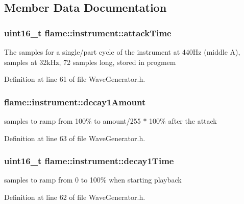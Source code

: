 \subsection{Member Data Documentation}
\hypertarget{structflame_1_1instrument_a9e8428ddc6afef3392234e1ed89bd442}{
\subsubsection[{attack\-Time}]{\setlength{\rightskip}{0pt plus 5cm}uint16\-\_\-t flame\-::instrument\-::attack\-Time}}\label{structflame_1_1instrument_a9e8428ddc6afef3392234e1ed89bd442}
The samples for a single/part cycle of the instrument at 440\-Hz (middle A), samples at 32k\-Hz, 72 samples long, stored in progmem 

Definition at line 61 of file Wave\-Generator.\-h.

\hypertarget{structflame_1_1instrument_a0a0e0263483ad2e903cbcb854493bc1b}{
\subsubsection[{decay1\-Amount}]{ flame\-::instrument\-::decay1\-Amount}}\label{structflame_1_1instrument_a0a0e0263483ad2e903cbcb854493bc1b}
samples to ramp from 100\% to amount/255 $\ast$ 100\% after the attack 

Definition at line 63 of file Wave\-Generator.\-h.

\hypertarget{structflame_1_1instrument_ad683abcb6de0196805bd230a2d59fb85}{
\subsubsection[{decay1\-Time}]{\setlength{\rightskip}{0pt plus 5cm}uint16\-\_\-t flame\-::instrument\-::decay1\-Time}}\label{structflame_1_1instrument_ad683abcb6de0196805bd230a2d59fb85}
samples to ramp from 0 to 100\% when starting playback 

Definition at line 62 of file Wave\-Generator.\-h.

